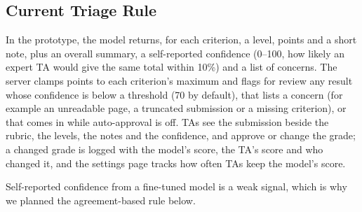 \documentclass[11pt,a4paper]{article}
\newif\ifdraft
\newcommand{\todo}[2]{%
  \ifdraft\textcolor{red}{\textbf{[TODO #1:} #2\textbf{]}}\fi}
\newcommand{\gradeai}{\textsc{GradeAI}}
\newcommand{\file}[1]{\nolinkurl{#1}}
\theoremstyle{definition}
\begin{document}
\subsection{Current Triage Rule}
In the prototype, the model returns, for each criterion, a level, points and a short note, plus an overall summary, a self-reported confidence (0--100, how likely an expert TA would give the same total within 10\%) and a list of concerns. The server clamps points to each criterion's maximum and flags for review any result whose confidence is below a threshold (70 by default), that lists a concern (for example an unreadable page, a truncated submission or a missing criterion), or that comes in while auto-approval is off. TAs see the submission beside the rubric, the levels, the notes and the confidence, and approve or change the grade; a changed grade is logged with the model's score, the TA's score and who changed it, and the settings page tracks how often TAs keep the model's score.
\todo{}{Add a screenshot of the review screen (\file{figures/dashboard.png}).}

Self-reported confidence from a fine-tuned model is a weak signal, which is why we planned the agreement-based rule below.

\end{document}
